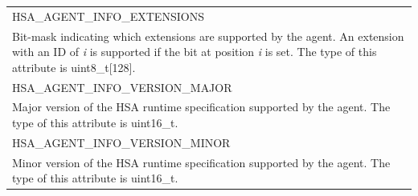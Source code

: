 \documentclass[final,oneside]{book}
\newcommand{\reftyp}[1]{#1}
\newcommand{\refenu}[1]{\reftyp{#1}}
\begin{document}
\begin{longtable}{@{\hspace{2em}}p{\linewidth-2em}}
\hspace{-2em}\refenu{HSA_\-AGENT_\-INFO_\-EXTENSIONS}\\Bit-mask indicating which extensions are supported by the agent. An extension with an ID of \textit{i} is supported if the bit at position \textit{i} is set. The type of this attribute is uint8_t[128].\\[2mm]
\hspace{-2em}\refenu{HSA_\-AGENT_\-INFO_\-VERSION_\-MAJOR}\\Major version of the HSA runtime specification supported by the agent. The type of this attribute is uint16_\-t.\\[2mm]
\hspace{-2em}\refenu{HSA_\-AGENT_\-INFO_\-VERSION_\-MINOR}\\Minor version of the HSA runtime specification supported by the agent. The type of this attribute is uint16_\-t.
\end{longtable}
\end{document}
